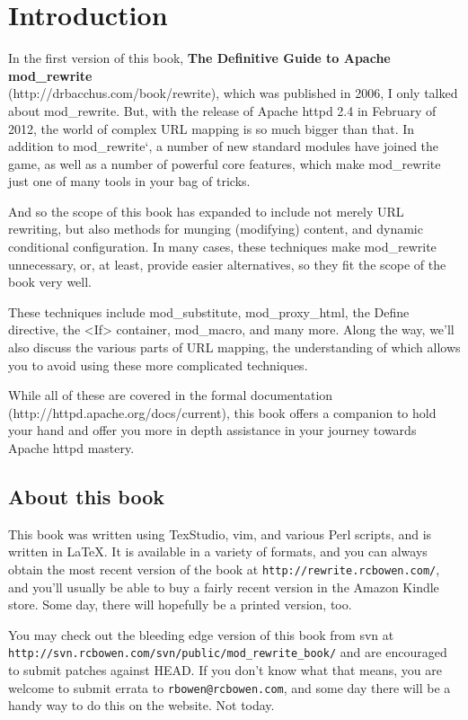 \chapter{Introduction}

In the first version of this book,
\textbf{The Definitive Guide to Apache mod\_rewrite}\\
(http://drbacchus.com/book/rewrite),
which was published in 2006, I only talked about mod\_rewrite. But,
with the release of Apache httpd 2.4 in February of 2012, the
world of complex URL mapping is so much bigger than that. In addition to mod\_rewrite`, a number of
new standard modules have joined the game, as well as a number of
powerful core features, which make mod\_rewrite just one of many tools
in your bag of tricks.

And so the scope of this book has expanded to include not merely URL
rewriting, but also methods for munging (modifying) content, and
dynamic conditional configuration. In many cases, these techniques make
mod\_rewrite unnecessary, or, at least, provide easier alternatives, so
they fit the scope of the book very well.

These techniques include mod\_substitute, mod\_proxy\_html, the Define
directive, the <If> container, mod\_macro, and many more. Along the
way, we'll also discuss the various parts of URL mapping, the
understanding of which allows you to avoid using these more complicated
techniques.

While all of these are covered in the formal documentation\\
(http://httpd.apache.org/docs/current), this book offers a companion
to hold your hand and offer you more in depth assistance in your journey
towards Apache httpd mastery.

\section{About this book}

This book was written using TexStudio, vim, and various Perl scripts, and is written in \LaTeX. It is available in a
variety of formats, and you can always obtain the most recent version of
the book at \verb~http://rewrite.rcbowen.com/~, and you'll usually be able to buy a fairly recent version
in the Amazon Kindle store. Some day, there will hopefully be a printed version, too.

You may check out the bleeding edge version of this book from svn at \verb~http://svn.rcbowen.com/svn/public/mod_rewrite_book/~ and are encouraged to submit patches against HEAD. If you don't know what that means, you are welcome to submit errata to \verb~rbowen@rcbowen.com~, and some day there will be a handy way to do this on the website. Not today.

